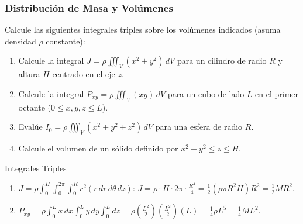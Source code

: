 \subsubsection{Distribución de Masa y Volúmenes}
Calcule las siguientes integrales triples sobre los volúmenes indicados (asuma densidad $\rho$ constante):

\begin{enumerate}
    \item Calcule la integral $J = \rho \iiint_V (x^2 + y^2) \, dV$ para un cilindro de radio $R$ y altura $H$ centrado en el eje $z$.
    \item Calcule la integral $P_{xy} = \rho \iiint_V (xy) \, dV$ para un cubo de lado $L$ en el primer octante ($0 \le x,y,z \le L$).
    \item Evalúe $I_0 = \rho \iiint_V (x^2 + y^2 + z^2) \, dV$ para una esfera de radio $R$.
    \item Calcule el volumen de un sólido definido por $x^2 + y^2 \le z \le H$.
\end{enumerate}
\begin{solucion}{Integrales Triples}
\begin{enumerate}
    \item $J = \rho \int_0^H \int_0^{2\pi} \int_0^R r^2 (r \, dr \, d\theta \, dz)$: 
    $J = \rho \cdot H \cdot 2\pi \cdot \frac{R^4}{4} = \frac{1}{2} (\rho \pi R^2 H) R^2 = \frac{1}{2} M R^2$.
    \item $P_{xy} = \rho \int_0^L x \, dx \int_0^L y \, dy \int_0^L dz = \rho (\frac{L^2}{2})(\frac{L^2}{2})(L) = \frac{1}{4} \rho L^5 = \frac{1}{4} ML^2$.
\end{enumerate}
\end{solucion}
